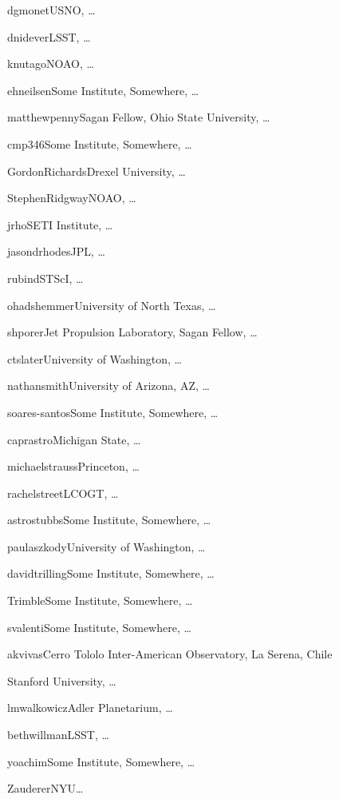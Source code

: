 \author{Dave Monet}{dgmonet}{USNO, \ldots}
\author{David Nidever}{dnidever}{LSST, \ldots}
\author{Knut Olsen}{knutago}{NOAO, \ldots}
\author{Eric Neilsen}{ehneilsen}{Some Institute, Somewhere, \ldots}
\author{Matthew T. Penny}{matthewpenny}{Sagan Fellow, Ohio State University, \ldots}
\author{Christina Peters}{cmp346}{Some Institute, Somewhere, \ldots}
\author{Gordon Richards}{GordonRichards}{Drexel University, \ldots}
\author{Stephen Ridgway}{StephenRidgway}{NOAO, \ldots}
\author{Jeonghee Rho}{jrho}{SETI Institute, \ldots}
\author{Jason Rhodes}{jasondrhodes}{JPL, \ldots}
\author{David Rubin}{rubind}{STScI, \ldots}
\author{Ohad Shemmer}{ohadshemmer}{University of North Texas, \ldots}
\author{Avi Shporer}{shporer}{Jet Propulsion Laboratory, Sagan Fellow, \ldots}
\author{Colin Slater}{ctslater}{University of Washington, \ldots}
\author{Nathan Smith}{nathansmith}{University of Arizona, AZ, \ldots}
\author{Marcelles Soares-Santos}{soares-santos}{Some Institute, Somewhere, \ldots}
\author{Jay Strader}{caprastro}{Michigan State, \ldots}
\author{Michael Strauss}{michaelstrauss}{Princeton, \ldots}
\author{Rachel Street}{rachelstreet}{LCOGT, \ldots}
\author{Christopher Stubbs}{astrostubbs}{Some Institute, Somewhere, \ldots}
\author{Paula Szkody}{paulaszkody}{University of Washington, \ldots}
\author{David Trilling}{davidtrilling}{Some Institute, Somewhere, \ldots}
\author{Virginia Trimble}{Trimble}{Some Institute, Somewhere, \ldots}
\author{Stefano Valenti}{svalenti}{Some Institute, Somewhere, \ldots}
\author{Kathy Vivas}{akvivas}{Cerro Tololo Inter-American Observatory, La Serena, Chile}
\author{Robert Wagoner}{}{Stanford University, \ldots}
\author{Lucianne Walkowicz}{lmwalkowicz}{Adler Planetarium, \ldots}
\author{Beth Willman}{bethwillman}{LSST, \ldots}
\author{Peter Yoachim}{yoachim}{Some Institute, Somewhere, \ldots}
\author{Bevin Ashley Zauderer}{Zauderer}{NYU\ldots}

